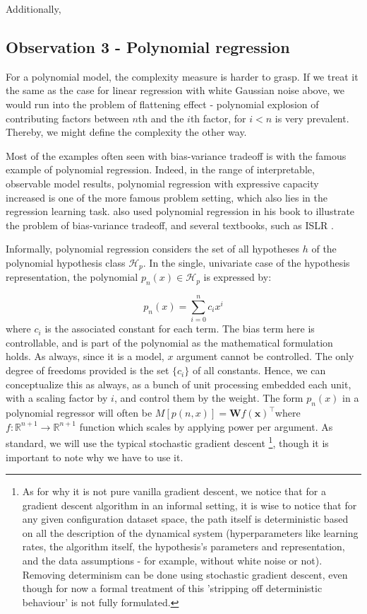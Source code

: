 \documentclass[twoside,10pt]{article}
\begin{document}
Additionally, 

\clearpage

\subsection{Observation 3 - Polynomial regression}

For a polynomial model, the complexity measure is harder to grasp. If we treat it the same as the case for linear regression with white Gaussian noise above, we would run into the problem of flattening effect - polynomial explosion of contributing factors between $n$th and the $i$th factor, for $i<n$ is very prevalent. Thereby, we might define the complexity the other way. 

Most of the examples often seen with bias-variance tradeoff is with the famous example of polynomial regression. Indeed, in the range of interpretable, observable model results, polynomial regression with expressive capacity increased is one of the more famous problem setting, which also lies in the regression learning task. \cite{goodfellow2016deep} also used polynomial regression in his book to illustrate the problem of bias-variance tradeoff, and several textbooks, such as ISLR \cite{gareth_james_introduction_2013}. 

Informally, polynomial regression considers the set of all hypotheses $h$ of the polynomial hypothesis class $\mathcal{H}_{p}$. In the single, univariate case of the hypothesis representation, the polynomial $p_{n}(x)\in \mathcal{H}_{p}$ is expressed by: 

\begin{equation*}
    p_{n}(x)=\sum^{n}_{i=0}c_{i}x^{i}
\end{equation*}
where $c_{i}$ is the associated constant for each term. The bias term here is controllable, and is part of the polynomial as the mathematical formulation holds. As always, since it is a model, $x$ argument cannot be controlled. The only degree of freedoms provided is the set $\{ c_{i} \}$ of all constants. Hence, we can conceptualize this as always, as a bunch of unit processing embedded each unit, with a scaling factor by $i$, and control them by the weight. The form $p_{n}(x)$ in a polynomial regressor will often be $M[p(n,x)]=\mathbf{W}f(\mathbf{x})^{\top}$where $f:\mathbb{R}^{n+1}\to \mathbb{R}^{n+1}$ function which scales by applying power per argument. As standard, we will use the typical stochastic gradient descent \footnote{As for why it is not pure vanilla gradient descent, we notice that for a gradient descent algorithm in an informal setting, it is wise to notice that for any given configuration dataset space, the path itself is deterministic based on all the description of the dynamical system (hyperparameters like learning rates, the algorithm itself, the hypothesis's parameters and representation, and the data assumptions - for example, without white noise or not). Removing determinism can be done using stochastic gradient descent, even though for now a formal treatment of this 'stripping off deterministic behaviour' is not fully formulated. }, though it is important to note why we have to use it. 
\end{document}
